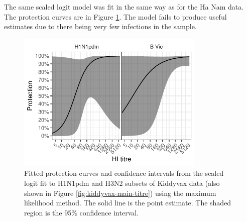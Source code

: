 The same scaled logit model was fit in the same way as for the Ha Nam data. The protection curves are in Figure \ref{fig:kiddyvaxmain-sclr-prot}. The model fails to produce useful estimates due to there being very few infections in the sample.

\begin{figure}[htp]
	\centering
	\includegraphics[width=0.8\textwidth]{../fit-sclr-plot/kiddyvaxmain-prot.pdf}
	\caption{
	Fitted protection curves and confidence intervals from the scaled logit fit to H1N1pdm and H3N2 subsets of Kiddyvax data (also shown in Figure \ref{fig:kiddyvax-main-titre}) using the maximum likelihood method. The solid line is the point estimate. The shaded region is the 95\% confidence interval.
	}
	\label{fig:kiddyvaxmain-sclr-prot}
\end{figure}
